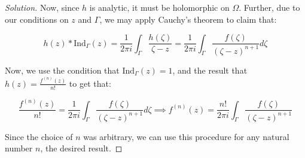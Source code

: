 \documentclass[10pt]{article}
\begin{document}
\begin{proof}[Solution]
Now, since $h$ is analytic, it must be holomorphic on $\Omega$. Further, due to our conditions on $z$ and $\Gamma$, we may apply Cauchy's theorem to claim that:

$$h(z) * \text{Ind}_\Gamma(z) = \frac{1}{2\pi i} \int_\Gamma \frac{h(\zeta)}{\zeta - z} = \frac{1}{2\pi i}  \int_{\Gamma} \frac{f(\zeta)}{(\zeta - z)^{n+1}} d\zeta $$

Now, we use the condition that $\text{Ind}_\Gamma(z) = 1$, and the result that $h(z) = \frac{f^{(n)}(z)}{n!}$ to get that:

$$ \frac{f^{(n)}(z)}{n!} = \frac{1}{2\pi i}  \int_{\Gamma} \frac{f(\zeta)}{(\zeta - z)^{n+1}} d\zeta \implies f^{(n)}(z) = \frac{n!}{2\pi i}  \int_{\Gamma} \frac{f(\zeta)}{(\zeta - z)^{n+1}}$$

Since the choice of $n$ was arbitrary, we can use this procedure for any natural number $n$, the desired result.


\end{proof}
\end{document}
